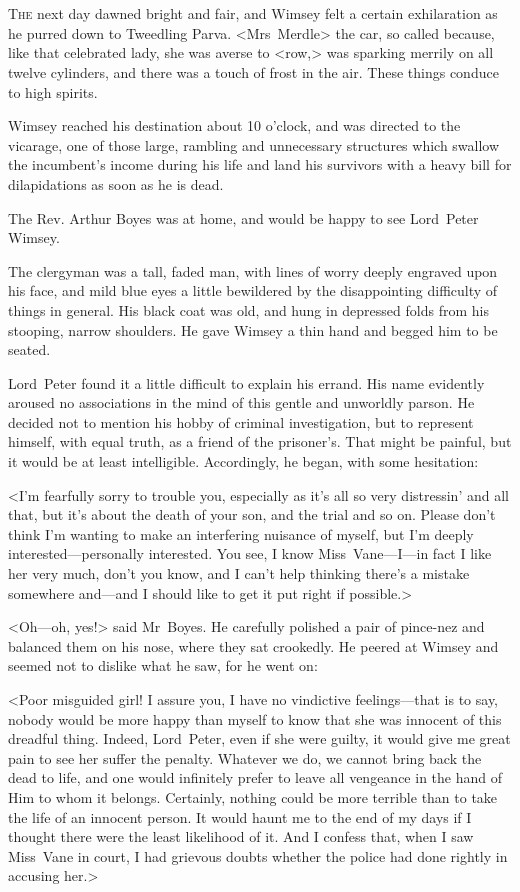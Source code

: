 \chapter[Chapter \thechapter]{}
\lettrine{T}{he} next day dawned bright and fair, and Wimsey felt a certain exhilaration as he purred down to Tweedling Parva. <Mrs~Merdle> the car, so called because, like that celebrated lady, she was averse to <row,> was sparking merrily on all twelve cylinders, and there was a touch of frost in the air. These things conduce to high spirits.

Wimsey reached his destination about 10 o'clock, and was directed to the vicarage, one of those large, rambling and unnecessary structures which swallow the incumbent's income during his life and land his survivors with a heavy bill for dilapidations as soon as he is dead.

The Rev. Arthur Boyes was at home, and would be happy to see Lord~Peter Wimsey.

The clergyman was a tall, faded man, with lines of worry deeply engraved upon his face, and mild blue eyes a little bewildered by the disappointing difficulty of things in general. His black coat was old, and hung in depressed folds from his stooping, narrow shoulders. He gave Wimsey a thin hand and begged him to be seated.

Lord~Peter found it a little difficult to explain his errand. His name evidently aroused no associations in the mind of this gentle and unworldly parson. He decided not to mention his hobby of criminal investigation, but to represent himself, with equal truth, as a friend of the prisoner's. That might be painful, but it would be at least intelligible. Accordingly, he began, with some hesitation:

<I'm fearfully sorry to trouble you, especially as it's all so very distressin' and all that, but it's about the death of your son, and the trial and so on. Please don't think I'm wanting to make an interfering nuisance of myself, but I'm deeply interested—personally interested. You see, I know Miss~Vane—I—in fact I like her very much, don't you know, and I can't help thinking there's a mistake somewhere and—and I should like to get it put right if possible.>

<Oh—oh, yes!> said Mr~Boyes. He carefully polished a pair of pince-nez and balanced them on his nose, where they sat crookedly. He peered at Wimsey and seemed not to dislike what he saw, for he went on:

<Poor misguided girl! I assure you, I have no vindictive feelings—that is to say, nobody would be more happy than myself to know that she was innocent of this dreadful thing. Indeed, Lord~Peter, even if she were guilty, it would give me great pain to see her suffer the penalty. Whatever we do, we cannot bring back the dead to life, and one would infinitely prefer to leave all vengeance in the hand of Him to whom it belongs. Certainly, nothing could be more terrible than to take the life of an innocent person. It would haunt me to the end of my days if I thought there were the least likelihood of it. And I confess that, when I saw Miss~Vane in court, I had grievous doubts whether the police had done rightly in accusing her.>

